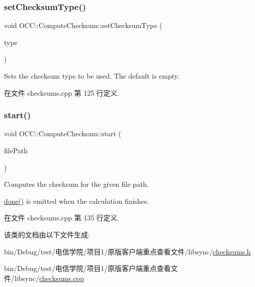 \mbox{\label{class_o_c_c_1_1_compute_checksum_a250c402004fbbc938d63970cae5915eb}} 
\subsubsection{\texorpdfstring{set\+Checksum\+Type()}{setChecksumType()}}
{\footnotesize\ttfamily void O\+C\+C\+::\+Compute\+Checksum\+::set\+Checksum\+Type (\begin{DoxyParamCaption}\item[{const Q\+Byte\+Array \&}]{type }\end{DoxyParamCaption})}

Sets the checksum type to be used. The default is empty. 

在文件 checksums.\+cpp 第 125 行定义.

\mbox{\label{class_o_c_c_1_1_compute_checksum_a1c151750dd262e30cc6691f86175f36c}} 
\subsubsection{\texorpdfstring{start()}{start()}}
{\footnotesize\ttfamily void O\+C\+C\+::\+Compute\+Checksum\+::start (\begin{DoxyParamCaption}\item[{const Q\+String \&}]{file\+Path }\end{DoxyParamCaption})}

Computes the checksum for the given file path.

\hyperlink{class_o_c_c_1_1_compute_checksum_a01c9dfa1598209e73ef617c758831e72}{done()} is emitted when the calculation finishes. 

在文件 checksums.\+cpp 第 135 行定义.



该类的文档由以下文件生成\+:\begin{DoxyCompactItemize}
\item 
bin/\+Debug/test/电信学院/项目1/原版客户端重点查看文件/libsync/\hyperlink{checksums_8h}{checksums.\+h}\item 
bin/\+Debug/test/电信学院/项目1/原版客户端重点查看文件/libsync/\hyperlink{checksums_8cpp}{checksums.\+cpp}\end{DoxyCompactItemize}
